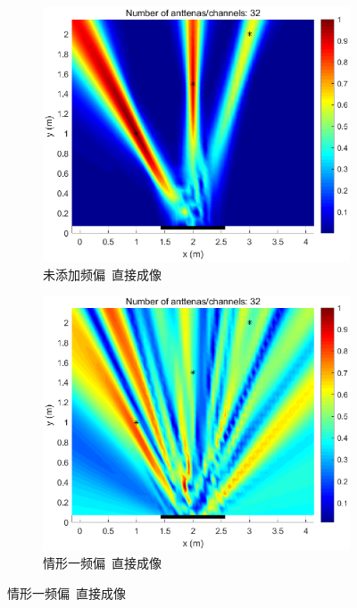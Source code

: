 \begin{figure}[H]
  \centering
  \begin{subfigure}[t]{.3\linewidth}
    \centering
    \includegraphics[width=1\textwidth]{figures/compare/CSI_without_freq.eps}
    \caption{未添加频偏~直接成像}
  \end{subfigure}
  \begin{subfigure}[t]{.3\linewidth}
    \centering
    \includegraphics[width=1\textwidth]{figures/compare/CSI_freq1.eps}
    \caption{情形一频偏~直接成像}
  \end{subfigure}

\end{figure}
